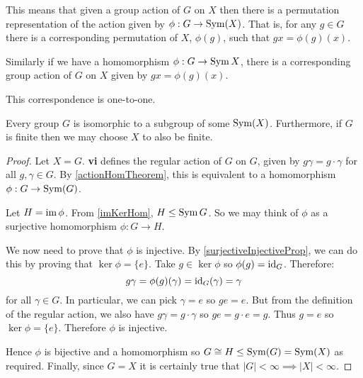 \documentclass[../main.tex]{subfiles}
\begin{document}
\begin{remark}[Intuition]
  This means that given a group action of $G$ on $X$ then there is a permutation representation of the action given by $\phi: G \to \operatorname{Sym}(X)$.
  That is, for any $g \in G$ there is a corresponding permutation of $X$, $\phi(g)$, such that $gx = \phi(g)(x)$.

  Similarly if we have a homomorphism $\phi: G \to \operatorname{Sym} X$, there is a corresponding group action of $G$ on $X$ given by $gx = \phi(g)(x)$.

  This correspondence is one-to-one.
\end{remark}
\begin{theorem}
  Every group $G$ is isomorphic to a subgroup of some $\operatorname{Sym}(X)$.
  Furthermore, if $G$ is finite then we may choose $X$ to also be finite.
\end{theorem}
\begin{proof}
  Let $X = G$.
   \textbf{vi} defines the regular action  of $G$ on $G$, given by $g\gamma = g \cdot \gamma$ for all $g, \gamma \in G$.
  By \cref{actionHomTheorem}, this is equivalent to a homomorphism $\phi: G \to \operatorname{Sym}(G)$.

  Let $H = \operatorname{im} \phi$.
  From \cref{imKerHom}, $H \leq \operatorname{Sym} G$.
  So we may think of $\phi$ as a surjective homomorphism $\phi: G \to H$.

  We now need to prove that $\phi$ is injective.
  By \cref{surjectiveInjectiveProp}, we can do this by proving that $\ker \phi  = \{e\}$.
  Take $g \in \ker \phi$ so $\phi(g) = \mathrm{id}_G$.
  Therefore:
  \[
    g \gamma = \phi(g)(\gamma) = \mathrm{id}_G(\gamma) = \gamma
  \]
  for all $\gamma \in G$.
  In particular, we can pick $\gamma = e$ so $ge = e$.
  But from the definition of the regular action, we also have $g\gamma = g \cdot \gamma$ so $ge = g \cdot e = g$.
  Thus $g = e$ so $\ker \phi = \{e\}$.
  Therefore $\phi$ is injective.

  Hence $\phi$ is bijective and a homomorphism so $G \cong H \leq \operatorname{Sym}(G) = \operatorname{Sym}(X)$  as required.
  Finally, since $G = X$ it is certainly true that $|G| < \infty \implies |X| < \infty$.
\end{proof}
\end{document}
